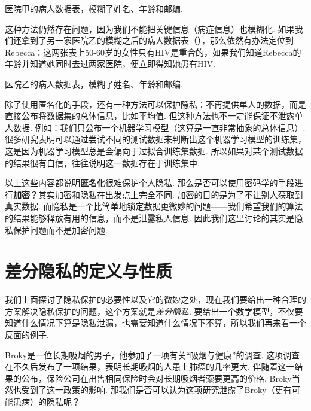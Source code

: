\begin{table}[!ht]
\centering

\caption{医院甲的病人数据表，模糊了姓名、年龄和邮编. }
\label{tab:tab02}
\end{table}

这种方法仍然存在问题，因为我们不能把关键信息（病症信息）也模糊化. 如果我们还拿到了另一家医院乙的模糊之后的病人数据表（），那么依然有办法定位到Rebecca：这两张表上50-60岁的女性只有HIV是重合的，如果我们知道Rebecca的年龄并知道她同时去过两家医院，便立即得知她患有HIV.

\begin{table}[!ht]
\centering

\caption{医院乙的病人数据表，模糊了姓名、年龄和邮编. }
\label{tab:tab03}
\end{table}

除了使用匿名化的手段，还有一种方法可以保护隐私：不再提供单人的数据，而是直接公布将数据集的总体信息，比如平均值. 但这种方法也不一定能保证不泄露单人数据. 例如：我们只公布一个机器学习模型（这算是一直非常抽象的总体信息）. 很多研究表明可以通过尝试不同的测试数据来判断出这个机器学习模型的训练集，这是因为机器学习模型总是会偏向于过拟合训练集数据. 所以如果对某个测试数据的结果很有自信，往往说明这一数据存在于训练集中. 

\begin{remark}
以上这些内容都说明\textbf{匿名化}很难保护个人隐私. 那么是否可以使用密码学的手段进行\textbf{加密}？其实加密和隐私在出发点上完全不同. 加密的目的是为了不让别人获取到真实数据. 而隐私是一个比简单地锁定数据更微妙的问题——我们希望我们的算法的结果能够释放有用的信息，而不是泄露私人信息. 因此我们这里讨论的其实是隐私保护问题而不是加密问题. 
\end{remark}

\section{差分隐私的定义与性质}

我们上面探讨了隐私保护的必要性以及它的微妙之处，现在我们要给出一种合理的方案解决隐私保护的问题，这个方案就是\emph{差分隐私}. 要给出一个数学模型，不仅要知道什么情况下算是隐私泄漏，也需要知道什么情况下不算，所以我们再来看一个反面的例子. 

Broky是一位长期吸烟的男子，他参加了一项有关“吸烟与健康”的调查. 这项调查在不久后发布了一项结果，表明长期吸烟的人患上肺癌的几率更大. 伴随着这一结果的公布，保险公司在出售相同保险时会对长期吸烟者索要更高的价格. Broky当然也受到了这一政策的影响. 那我们是否可以认为这项研究泄露了Broky（更有可能患病）的隐私呢？


